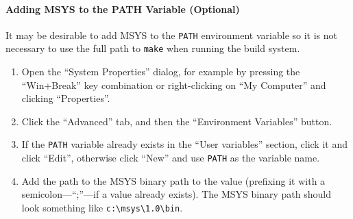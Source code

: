 \paragraph{Adding MSYS to the PATH Variable (Optional)}

It may be desirable to add MSYS to the \verb|PATH| environment variable so it is not necessary to 
use the full path to \verb|make| when running the build system.

\begin{enumerate}

\item Open the ``System Properties'' dialog, for example by pressing the ``Win+Break'' key 
combination or right-clicking on ``My Computer'' and clicking ``Properties''.

\item Click the ``Advanced'' tab, and then the ``Environment Variables'' button.

\item If the \verb|PATH| variable already exists in the ``User variables'' section, click it and 
click ``Edit'', otherwise click ``New'' and use \verb|PATH| as the variable name.

\item Add the path to the MSYS binary path to the value (prefixing it with a semicolon---``;''---if 
a value already exists).  The MSYS binary path should look something like \verb|c:\msys\1.0\bin|.

\end{enumerate}









